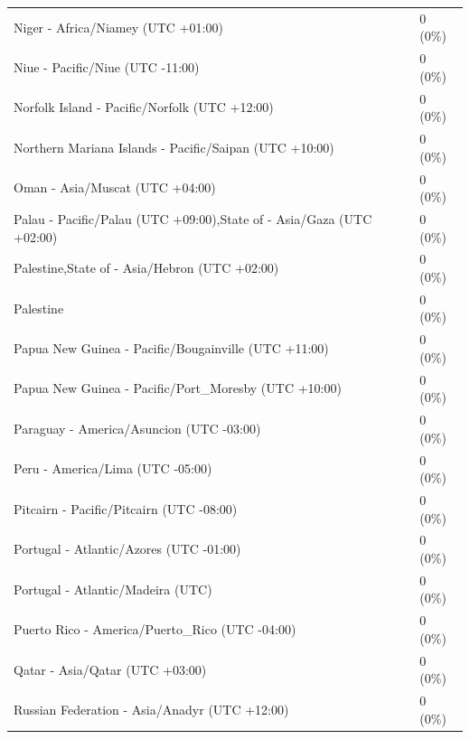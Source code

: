 \begin{appendix}
\begin{table}
{\begin{tabular}[t]{ll}
\addlinespace
\hspace{1em}Niger - Africa/Niamey (UTC +01:00) & 0 (0\%)\\
\hspace{1em}Niue - Pacific/Niue (UTC -11:00) & 0 (0\%)\\
\hspace{1em}Norfolk Island - Pacific/Norfolk (UTC +12:00) & 0 (0\%)\\
\hspace{1em}Northern Mariana Islands - Pacific/Saipan (UTC +10:00) & 0 (0\%)\\
\hspace{1em}Oman - Asia/Muscat (UTC +04:00) & 0 (0\%)\\
\addlinespace
\hspace{1em}Palau - Pacific/Palau (UTC +09:00),State of - Asia/Gaza (UTC +02:00) & 0 (0\%)\\
\hspace{1em}Palestine,State of - Asia/Hebron (UTC +02:00) & 0 (0\%)\\
\hspace{1em}Palestine & 0 (0\%)\\
\hspace{1em}Papua New Guinea - Pacific/Bougainville (UTC +11:00) & 0 (0\%)\\
\hspace{1em}Papua New Guinea - Pacific/Port\_Moresby (UTC +10:00) & 0 (0\%)\\
\addlinespace
\hspace{1em}Paraguay - America/Asuncion (UTC -03:00) & 0 (0\%)\\
\hspace{1em}Peru - America/Lima (UTC -05:00) & 0 (0\%)\\
\hspace{1em}Pitcairn - Pacific/Pitcairn (UTC -08:00) & 0 (0\%)\\
\hspace{1em}Portugal - Atlantic/Azores (UTC -01:00) & 0 (0\%)\\
\hspace{1em}Portugal - Atlantic/Madeira (UTC) & 0 (0\%)\\
\addlinespace
\hspace{1em}Puerto Rico - America/Puerto\_Rico (UTC -04:00) & 0 (0\%)\\
\hspace{1em}Qatar - Asia/Qatar (UTC +03:00) & 0 (0\%)\\
\hspace{1em}Russian Federation - Asia/Anadyr (UTC +12:00) & 0 (0\%)\\

\end{tabular}}
\end{table}
\end{appendix}
